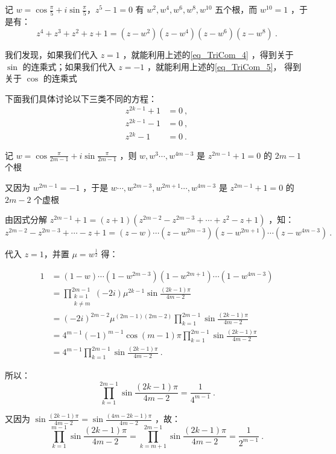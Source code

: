 记 $\displaystyle{w=\cos\frac{\pi}5+i\sin\frac{\pi}5}$，$z^5-1=0$ 有 $w^2,w^4,w^6,w^8,w^{10}$ 五个根，而 $w^{10}=1$ ，于是有：
$$z^4+z^3+z^2+z+1=(z-w^2)(z-w^4)(z-w^6)(z-w^8)~.$$

我们发现，如果我们代入 $z=1$ ，就能利用上述的\autoref{eq_TriCom_4}  ，得到关于 $\sin$ 的连乘式；如果我们代入 $z=-1$ ，就能利用上述的\autoref{eq_TriCom_5}， 得到关于 $\cos$ 的连乘式

下面我们具体讨论以下三类不同的方程：
$$\begin{aligned}
z^{2k-1}+1&=0~,\\z^{2k-1}-1&=0~, \\z^{2k}-1&=0~.
\end{aligned}$$

记 $\displaystyle{w=\cos\frac{\pi}{2m-1}+i\sin\frac{\pi}{2m-1}}$ ，则 $w,w^3\cdots,w^{4m-3}$ 是 $z^{2m-1}+1=0$ 的 $2m-1$ 个根

又因为 $w^{2m-1}=-1$ ，于是 $w\cdots ,w^{2m-3},w^{2m+1}\cdots ,w^{4m-3}$ 是 $z^{2m-1}+1=0$ 的 $2m-2$ 个虚根

由因式分解 $z^{2m-1}+1=(z+1)(z^{2m-2}-z^{2m-3}+\cdots+z^{2}-z+1)$ ，知：
$$z^{2m-2}-z^{2m-3}+\cdots-z+1=(z-w)\cdots(z-w^{2m-3})(z-w^{2m+1})\cdots(z-w^{4m-3})~.$$

代入 $z=1$，并置 $\mu=w^{\frac12}$ 得：

$$\begin{aligned}
1&=(1-w)\cdots(1-w^{2m-3})(1-w^{2m+1})\cdots(1-w^{4m-3})\\&=\prod_{\substack{k=1\\k\neq m}}^{2m-1}(-2i)\mu^{2k-1}\sin\frac{(2k-1)\pi}{4m-2}\\&=(-2i)^{2m-2}{\mu}^{(2m-1)(2m-2)}\prod_{k=1}^{2m-1}\sin{\frac{(2k-1)\pi}{4m-2}}\\ &=4^{m-1}(-1)^{m-1}\cos(m-1)\pi\prod_{k=1}^{2m-1}\sin{\frac{(2k-1)\pi}{4m-2}}\\ &=4^{m-1}\prod_{k=1}^{2m-1}\sin{\frac{(2k-1)\pi}{4m-2}} ~. 
\end{aligned}$$

所以： 
\begin{equation}%
\prod_{k=1}^{2m-1}\sin{\frac{(2k-1)\pi}{4m-2}}=\frac{1}{4^{m-1}}~.
\end{equation}

又因为 $\displaystyle{\sin\frac{(2k-1)\pi}{4m-2}=\sin\frac{(4m-2k-1)\pi}{4m-2}}$ ，故：
\begin{equation}%
\prod_{k=1}^{m-1}\sin{\frac{(2k-1)\pi}{4m-2}}=\prod_{k=m+1}^{2m-1}\sin{\frac{(2k-1)\pi}{4m-2}}=\frac{1}{2^{m-1}}~.
\end{equation}

